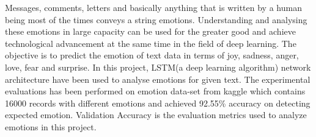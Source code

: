 Messages, comments, letters and basically anything that is written by a human being most of the times conveys a string emotions. Understanding and analysing these emotions in large capacity can be used for the greater good and achieve technological advancement at the same time in the field of deep learning. The objective is to predict the emotion of text data in terms of joy, sadness, anger, love, fear and surprise. In this project, LSTM(a deep learning algorithm) network architecture have been used to analyse emotions for given text. The experimental evaluations has been performed on emotion data-set from kaggle which contains 16000 records with different emotions and achieved 92.55\% accuracy on detecting expected emotion. Validation Accuracy is the evaluation metrics used to analyze emotions in this project.
\endinput
